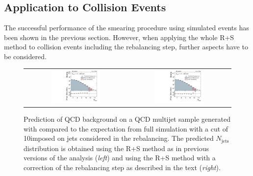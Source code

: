 \subsection{Application to Collision Events}
\label{subsec:RPlusS_app} 
The successful performance of the smearing procedure using simulated events has been shown in the previous section. However, when applying the whole R+S method to collision events including the rebalancing step, further aspects have to be considered. 
\begin{figure}[!t]
  \centering
  \begin{tabular}{cc}
                \includegraphics[width=0.49\textwidth]{figures/NJets_baseline_withoutMHT_madgraph_DR53X_chs_TuneZ2star_pt10_withoutPUReweighting_DoNotUseRebCorrection_v1.pdf} &
                \includegraphics[width=0.49\textwidth]{figures/NJets_baseline_withoutMHT_madgraph_DR53X_chs_TuneZ2star_pt10_withoutPUReweighting_UseRebCorrection_v1.pdf} 

  \end{tabular}
  \caption{Prediction of QCD background on a QCD multijet sample generated with \madgraph compared to the expectation from full simulation with a \pt cut of 10\gev imposed on jets considered in the rebalancing. The predicted $N_{\text{jets}}$ distribution is obtained using the R+S method as in previous versions of the analysis (\textit{left}) and using the R+S method with a correction of the rebalancing step as described in the text (\textit{right}).}
  \label{fig:qcd_rs_rebnjets}
\end{figure}
\\
